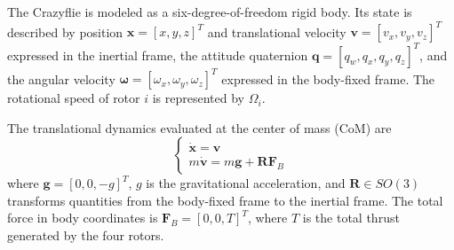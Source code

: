 \documentclass[journal]{IEEEtran}
\begin{document}
The Crazyflie is modeled as a six-degree-of-freedom rigid body. Its state is described by position $\mathbf{x}=[x,y,z]^T$ and translational velocity $\mathbf{v}=[v_x,v_y,v_z]^T$ expressed in the inertial frame, the attitude quaternion $\mathbf{q}=[q_w,q_x,q_y,q_z]^T$, and the angular velocity $\boldsymbol{\omega}=[\omega_x,\omega_y,\omega_z]^T$ expressed in the body-fixed frame. The rotational speed of rotor $i$ is represented by $\Omega_i$.

The translational dynamics evaluated at the center of mass (CoM) are
%
\begin{equation}
\begin{cases}
{\dot{\mathbf{x}}=\mathbf{v}}\\
{m\dot{\mathbf{v}}=m\mathbf{g}+\mathbf{R}\mathbf{F}_{B}}
\end{cases}
\label{eq_vehicle_trasl}
\end{equation}
where $\mathbf{g}=[0,0,-g]^T$, $g$ is the gravitational acceleration, and $\mathbf{R}\in SO(3)$ transforms quantities from the body-fixed frame to the inertial frame. The total force in body coordinates is $\mathbf{F}_{B}=[0,0,T]^T$, where $T$ is the total thrust generated by the four rotors.
%
\end{document}
